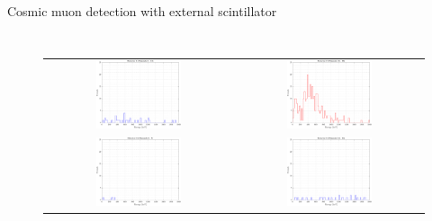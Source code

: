\documentclass[aspectratio=169,xcolor=dvipsnames,handout]{beamer} %
\newcommand\B{\rule[-1.2ex]{0pt}{0pt}} %
\begin{document}
\begin{frame}{Cosmic muon detection with external scintillator}
\begin{columns}
\begin{figure}[h!]
\begin{tabular}{c c}
                    \includegraphics[width=0.47\textwidth]{images/muon_detection/incoming_energy34_2hr_sens2_keV_lin.pdf} & \includegraphics[width=0.47\textwidth]{images/muon_detection/incoming_energy34_2hr_sens3_keV_lin.pdf}\B \\
                    \includegraphics[width=0.47\textwidth]{images/muon_detection/incoming_energy34_2hr_sens1_keV_lin.pdf} & \includegraphics[width=0.47\textwidth]{images/muon_detection/incoming_energy34_2hr_sens4_keV_lin.pdf}
                \end{tabular}
            \end{figure}
    \end{columns}
\end{frame}
\end{document}
